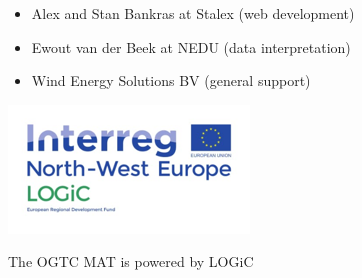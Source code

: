 \documentclass{article}[11pt]
\begin{document}
\begin{multicols}{2}
\begin{itemize}

\item Alex and Stan Bankras at Stalex (web development)

\item Ewout van der Beek at NEDU (data interpretation)

\item Wind Energy Solutions BV (general support)

\end{itemize}

\vfill

\begin{center}

\includegraphics[width=\linewidth]{logiclogo.png}

\end{center}

\centering \small{The OGTC MAT is powered by LOGiC}

\end{multicols}
\end{document}
